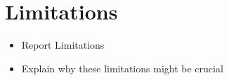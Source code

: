 \section{Limitations}

\begin{itemize}
\item Report Limitations
\item Explain why these limitations might be crucial
\end{itemize}